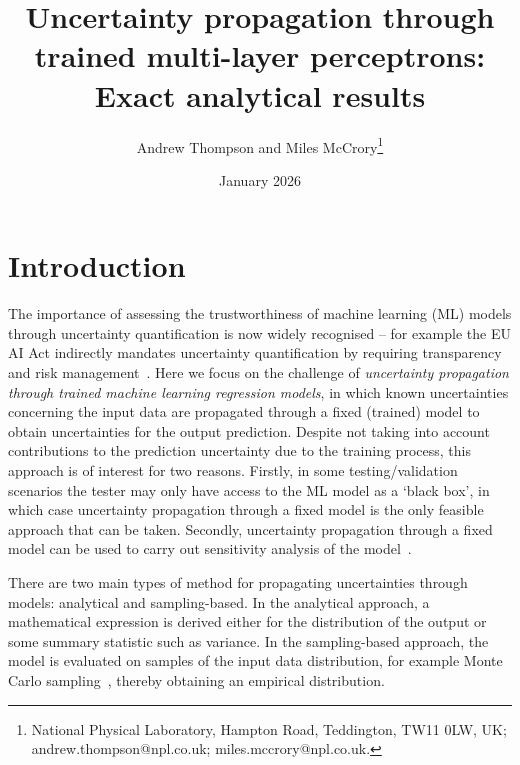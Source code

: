 \documentclass{article}
\title{Uncertainty propagation through trained multi-layer perceptrons: Exact analytical results}
\author{Andrew Thompson and Miles McCrory\footnote{National Physical Laboratory, Hampton Road, Teddington, TW11 0LW, UK;\\ \indent\;\; andrew.thompson@npl.co.uk; miles.mccrory@npl.co.uk.}}
\date{January 2026}
\begin{document}
\maketitle


\section{Introduction}\label{sec:intro}

The importance of assessing the trustworthiness of machine learning (ML) models through uncertainty quantification is now widely recognised -- for example the EU AI Act indirectly mandates uncertainty quantification by requiring transparency and risk management~\cite{deuschel2024role}. Here we focus on the challenge of \emph{uncertainty propagation through trained machine learning regression models}, in which known uncertainties concerning the input data are propagated through a fixed (trained) model to obtain uncertainties for the output prediction. Despite not taking into account contributions to the prediction uncertainty due to the training process, this approach is of interest for two reasons. Firstly, in some testing/validation scenarios the tester may only have access to the ML model as a `black box', in which case uncertainty propagation through a fixed model is the only feasible approach that can be taken. Secondly, uncertainty propagation through a fixed model can be used to carry out sensitivity analysis of the model~\cite{borgonovo2016sensitivity}.

There are two main types of method for propagating uncertainties through models: analytical and sampling-based. In the analytical approach, a mathematical expression is derived either for the distribution of the output or some summary statistic such as variance. In the sampling-based approach, the model is evaluated on samples of the input data distribution, for example Monte Carlo sampling~\cite{bipm2008supplement}, thereby obtaining an empirical distribution.
\end{document}
